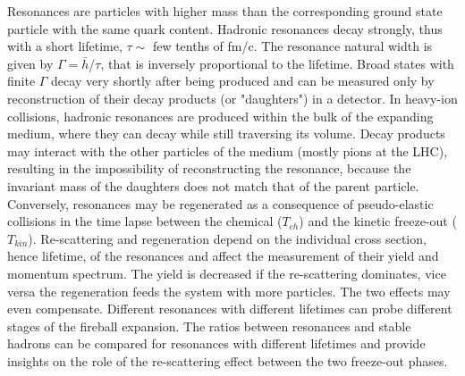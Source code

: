 Resonances are particles with higher mass than the corresponding ground state particle with the same quark content. Hadronic resonances decay strongly, thus with a short lifetime, $\tau \sim$ few tenths of fm/c. The resonance natural width is given by $\Gamma = \bar{h}$/$\tau$, that is inversely proportional to the lifetime. Broad states with finite $\Gamma$ decay very shortly after being produced and can be measured only by reconstruction of their decay products (or "daughters") in a detector. In heavy-ion collisions, hadronic resonances are produced within the bulk of the expanding medium, where they can decay while still traversing its volume. Decay products may interact with the other particles of the medium (mostly pions at the LHC), resulting in the impossibility of reconstructing the resonance, because the invariant mass of the daughters does not match that of the parent particle. Conversely, resonances may be regenerated as a consequence of pseudo-elastic collisions in the time lapse between the chemical ($T_{ch}$) and the kinetic freeze-out ($T_{kin}$). Re-scattering and regeneration depend on the individual cross section, hence lifetime, of the resonances and affect the measurement of their yield and momentum spectrum. The yield is decreased if the re-scattering dominates, vice versa the regeneration feeds the system with more particles. The two effects may even compensate.
Different resonances with different lifetimes can probe different stages of the fireball expansion. The ratios between resonances and stable hadrons can be compared for resonances with different lifetimes and provide insights on the role of the re-scattering effect between the two freeze-out phases.


\newpage